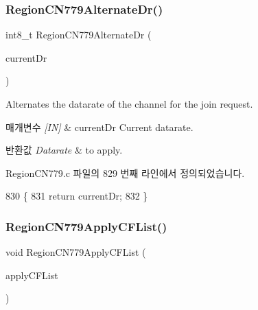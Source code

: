 \subsubsection{\texorpdfstring{Region\+C\+N779\+Alternate\+Dr()}{RegionCN779AlternateDr()}}
{\footnotesize\ttfamily int8\+\_\+t Region\+C\+N779\+Alternate\+Dr (\begin{DoxyParamCaption}\item[{int8\+\_\+t}]{current\+Dr }\end{DoxyParamCaption})}



Alternates the datarate of the channel for the join request. 


\begin{DoxyParams}{매개변수}
{\em \mbox{[}\+I\+N\mbox{]}} & current\+Dr Current datarate.\\
\hline
\end{DoxyParams}

\begin{DoxyRetVals}{반환값}
{\em Datarate} & to apply. \\
\hline
\end{DoxyRetVals}


Region\+C\+N779.\+c 파일의 829 번째 라인에서 정의되었습니다.


\begin{DoxyCode}
830 \{
831     \textcolor{keywordflow}{return} currentDr;
832 \}
\end{DoxyCode}
\mbox{\label{group___r_e_g_i_o_n_c_n779_ga7f02e6a802649d9b93c4c56eff271a26}} 
\subsubsection{\texorpdfstring{Region\+C\+N779\+Apply\+C\+F\+List()}{RegionCN779ApplyCFList()}}
{\footnotesize\ttfamily void Region\+C\+N779\+Apply\+C\+F\+List (\begin{DoxyParamCaption}\item[{\mbox{\hyperlink{group___r_e_g_i_o_n_ga71588e9ad07e34b78fa91d51881fd3c6}{Apply\+C\+F\+List\+Params\+\_\+t}} $\ast$}]{apply\+C\+F\+List }\end{DoxyParamCaption})}



